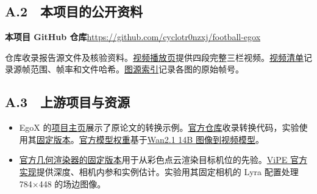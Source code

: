 \documentclass[UTF8,a4paper,11pt,fontset=fandol]{ctexart}
\begin{document}
\subsection*{A.2　本项目的公开资料}
\noindent\textbf{本项目 GitHub 仓库}\quad\url{https://github.com/cyclotr0nzxj/football-egox}\par
仓库收录报告源文件及核验资料。\href{https://cyclotr0nzxj.github.io/football-egox/}{视频播放页}提供四段完整三栏视频。\href{https://github.com/cyclotr0nzxj/football-egox/blob/main/appendix/manifest.json}{视频清单}记录源帧范围、帧率和文件哈希。\href{https://github.com/cyclotr0nzxj/football-egox/blob/main/report/source-data.json}{图源索引}记录各图的原始帧号。

\subsection*{A.3　上游项目与资源}
\begin{itemize}
\item EgoX 的\href{https://keh0t0.github.io/EgoX/}{项目主页}展示了原论文的转换示例。\href{https://github.com/DAVIAN-Robotics/EgoX}{官方仓库}收录转换代码，实验使用其\href{https://github.com/DAVIAN-Robotics/EgoX/tree/43c095b552a8f09d3a81c0882491f52c5cf4e953}{固定版本}。\href{https://huggingface.co/DAVIAN-Robotics/EgoX}{官方模型权重}基于\href{https://huggingface.co/Wan-AI/Wan2.1-I2V-14B-480P-Diffusers}{Wan2.1 14B 图像到视频模型}。
\item \href{https://github.com/kdh8156/EgoX-EgoPriorRenderer/tree/17cdef688885c3ac6a4c371a2d620391cc28dab4}{官方几何渲染器的固定版本}用于从彩色点云渲染目标机位的先验。\href{https://github.com/nv-tlabs/vipe}{ViPE 官方实现}提供深度、相机内参和实例估计。实验用其固定相机的 Lyra 配置处理 784×448 的场边图像。
\end{itemize}
\end{document}
